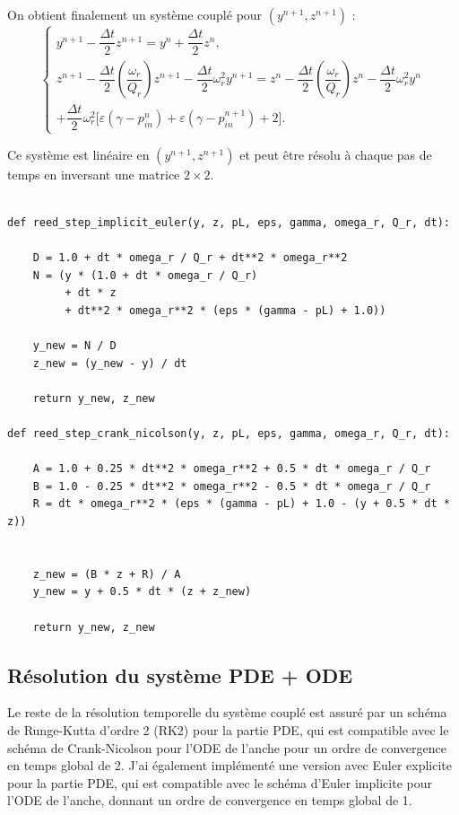 \documentclass[12pt,a4paper]{article}
\begin{document}
On obtient finalement un système couplé pour $(y^{n+1}, z^{n+1})$ :
\begin{equation}
\begin{cases}
y^{n+1} - \dfrac{\Delta t}{2} z^{n+1}
= y^n + \dfrac{\Delta t}{2} z^n, \\
z^{n+1} - \dfrac{\Delta t}{2}\left(\dfrac{\omega_r}{Q_r}\right) z^{n+1}
- \dfrac{\Delta t}{2}\omega_r^2 y^{n+1}
=
z^n
- \dfrac{\Delta t}{2}\left(\dfrac{\omega_r}{Q_r}\right) z^n
- \dfrac{\Delta t}{2}\omega_r^2 y^n \\
+ \dfrac{\Delta t}{2}\omega_r^2 \Big[
  \varepsilon(\gamma - p_{in}^n)
+
\varepsilon(\gamma - p_{in}^{n+1})
+ 2
  \Big].
  \end{cases}
\end{equation}

Ce système est linéaire en $(y^{n+1}, z^{n+1})$ et peut être résolu à chaque pas de temps en inversant une matrice $2\times2$.


\begin{verbatim}

def reed_step_implicit_euler(y, z, pL, eps, gamma, omega_r, Q_r, dt):
    
    D = 1.0 + dt * omega_r / Q_r + dt**2 * omega_r**2
    N = (y * (1.0 + dt * omega_r / Q_r)
         + dt * z
         + dt**2 * omega_r**2 * (eps * (gamma - pL) + 1.0))

    y_new = N / D
    z_new = (y_new - y) / dt

    return y_new, z_new

def reed_step_crank_nicolson(y, z, pL, eps, gamma, omega_r, Q_r, dt):
    
    A = 1.0 + 0.25 * dt**2 * omega_r**2 + 0.5 * dt * omega_r / Q_r
    B = 1.0 - 0.25 * dt**2 * omega_r**2 - 0.5 * dt * omega_r / Q_r
    R = dt * omega_r**2 * (eps * (gamma - pL) + 1.0 - (y + 0.5 * dt * z))


    z_new = (B * z + R) / A
    y_new = y + 0.5 * dt * (z + z_new)

    return y_new, z_new
\end{verbatim}

\subsection{Résolution du système PDE + ODE}

Le reste de la résolution temporelle du système couplé est assuré par un schéma de Runge-Kutta d'ordre 2 (RK2) pour la partie PDE, qui est compatible avec le schéma de Crank-Nicolson pour l'ODE de l'anche 
pour un ordre de convergence en temps global de 2. J'ai également implémenté une version avec Euler explicite pour la partie PDE, qui est compatible avec le schéma d'Euler implicite pour l'ODE de l'anche, 
donnant un ordre de convergence en temps global de 1.
\end{document}
